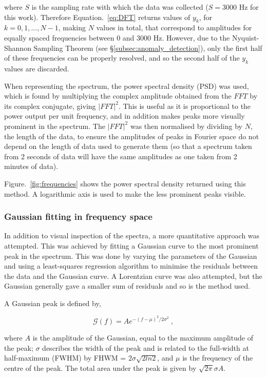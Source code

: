 where $S$ is the sampling rate with which the data was collected ($S=3000$ Hz for this work). Therefore Equation.~\eqref{eq:DFT} returns values of $y_k$, for $k = 0,1,...,N-1$, making $N$ values in total, that correspond to amplitudes for equally spaced frequencies between $0$ and $3000$ Hz. However, due to the Nyquist-Shannon Sampling Theorem (see \S\ref{subsec:anomaly_detection}), only the first half of these frequencies can be properly resolved, and so the second half of the $y_k$ values are discarded.

When representing the spectrum, the power spectral density (PSD) was used, which is found by multiplying the complex amplitude obtained from the $FFT$ by its complex conjugate, giving $|FFT|^2$. This is useful as it is proportional to the power output per unit frequency, and in addition makes peaks more visually prominent in the spectrum. The $|FFT|^2$ was then normalised by dividing by $N$, the length of the data, to ensure the amplitudes of peaks in Fourier space do not depend on the length of data used to generate them (so that a spectrum taken from 2 seconds of data will have the same amplitudes as one taken from 2 minutes of data).

Figure.~\ref{fig:frequencies} shows the power spectral density returned using this method. A logarithmic axis is used to make the less prominent peaks visible.

\subsubsection{Gaussian fitting in frequency space}

In addition to visual inspection of the spectra, a more quantitative approach was attempted. This was achieved by fitting a Gaussian curve to the most prominent peak in the spectrum. This was done by varying the parameters of the Gaussian and using a least-squares regression algorithm to minimise the residuals between the data and the Gaussian curve. A Lorentzian curve was also attempted, but the Gaussian generally gave a smaller sum of residuals and so is the method used. 

A Gaussian peak is defined by,

\begin{equation}
   \mathcal{G}(f) = A e^{-(f-\mu)^2/2\sigma^2}~,
    \label{eq:gaussian}
\end{equation}

where $A$ is the amplitude of the Gaussian, equal to the maximum amplitude of the peak; $\sigma$ describes the width of the peak and is related to the full-width at half-maximum (FWHM) by FHWM = $2\sigma \sqrt{2ln2}$, and $\mu$ is the frequency of the centre of the peak. The total area under the peak is given by $\sqrt{2\pi}\sigma A$.

